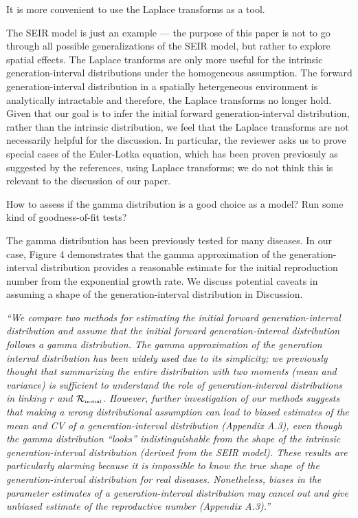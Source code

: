 \documentclass[12pt]{article}
\newcommand{\Rx}[1]{\ensuremath{{\cal R}_{#1}}}
\newcommand{\Rini}{\Rx{\textrm{\tiny initial}}}
\newcommand{\revtext}{\textsf}
\newcommand{\newtext}[1]{\textsl{``#1''}}
\begin{document}
\revtext{
It is more convenient to use the Laplace transforms as a tool.
}

The SEIR model is just an example --- the purpose of this paper is not to go through all possible generalizations of the SEIR model, but rather to explore spatial effects.
The Laplace tranforms are only more useful for the intrinsic generation-interval distributions under the homogeneous assumption. 
The forward generation-interval distribution in a spatially hetergeneous environment is analytically intractable and therefore, the Laplace transforms no longer hold.
Given that our goal is to infer the initial forward generation-interval distribution, rather than the intrinsic distribution, we feel that the Laplace transforms are not necessarily helpful for the discussion.
In particular, the reviewer asks us to prove special cases of the Euler-Lotka equation, which has been proven previosuly as suggested by the references, using Laplace transforms; 
we do not think this is relevant to the discussion of our paper.

\revtext{How to assess if the gamma distribution is a good choice as a
model? Run some kind of goodness-of-fit tests?}

The gamma distribution has been previously tested for many diseases. 
In our case, Figure 4 demonstrates that the gamma approximation of the generation-interval distribution provides a reasonable estimate for the initial reproduction number from the exponential growth rate.
We discuss potential caveats in assuming a shape of the generation-interval distribution in Discussion.

\newtext{We compare two methods for estimating the initial forward generation-interval distribution and assume that the initial forward generation-interval distribution follows a gamma distribution.
The gamma approximation of the generation interval distribution has been widely used due to its simplicity;
we previously thought that summarizing the entire distribution with two moments (mean and variance) is sufficient to understand the role of generation-interval distributions in linking $r$ and $\Rini$.
However, further investigation of our methods suggests that making a wrong distributional assumption can lead to biased estimates of the mean and CV of a generation-interval distribution (Appendix A.3), even though the gamma distribution ``looks'' indistinguishable from the shape of the intrinsic generation-interval distribution (derived from the SEIR model).
These results are particularly alarming because it is impossible to know the true shape of the generation-interval distribution for real diseases.
Nonetheless, biases in the parameter estimates of a generation-interval distribution may cancel out and give unbiased estimate of the reproductive number (Appendix A.3).}
\end{document}
